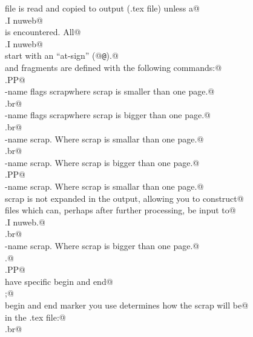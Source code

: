 \documentclass[a4paper]{report}
\begin{document}
\begin{flushleft}
\begin{list}{}{}
\mbox{}\verb@The file is read and copied to output (.tex file) unless a@\\
\mbox{}\verb@.I nuweb@\\
\mbox{}\verb@command is encountered. All@\\
\mbox{}\verb@.I nuweb@\\
\mbox{}\verb@commands start with an ``at-sign'' (@{\tt @}\verb@).@\\
\mbox{}\verb@Files and fragments are defined with the following commands:@\\
\mbox{}\verb@.PP@\\
\mbox{}\verb@o \fIfile-name flags  scrap\fP  where scrap is smaller than one page.@\\
\mbox{}\verb@.br@\\
\mbox{}\verb@O \fIfile-name flags  scrap\fP  where scrap is bigger than one page.@\\
\mbox{}\verb@.br@\\
\mbox{}\verb@d \fIfragment-name scrap\fP. Where scrap is smallar than one page.@\\
\mbox{}\verb@.br@\\
\mbox{}\verb@D \fIfragment-name scrap\fP. Where scrap is bigger than one page.@\\
\mbox{}\verb@.PP@\\
\mbox{}\verb@q \fIfragment-name scrap\fP. Where scrap is smallar than one page.@\\
\mbox{}\verb@The scrap is not expanded in the output, allowing you to construct@\\
\mbox{}\verb@output files which can, perhaps after further processing, be input to@\\
\mbox{}\verb@.I nuweb.@\\
\mbox{}\verb@.br@\\
\mbox{}\verb@Q \fIfragment-name scrap\fP. Where scrap is bigger than one page.@\\
\mbox{}\verb@Likewise.@\\
\mbox{}\verb@.PP@\\
\mbox{}\verb@Scraps have specific begin and end@\\
\mbox{}\verb@markers;@\\
\mbox{}\verb@which begin and end marker you use determines how the scrap will be@\\
\mbox{}\verb@typeset in the .tex file:@\\
\mbox{}\verb@.br@\\

\end{list}
\end{flushleft}
\end{document}
